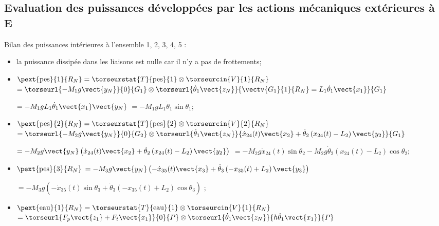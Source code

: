\begin{multicols}{2}
\begin{corrige}
\end{corrige}
\else
\fi


\subsection*{Evaluation des puissances développées par les actions mécaniques extérieures à E}
\ifprof
\begin{corrige}
Bilan des puissances intérieures à l'ensemble 1, 2, 3, 4, 5 :
\begin{itemize}
\item la puissance dissipée dans les liaisons est nulle car il n'y a pas de frottements;
\item  $\pext{\text{pes}}{1}{R_N} = \torseurstat{T}{\text{pes}}{1}\otimes \torseurcin{V}{1}{R_N}$ 
$=\torseurl{-M_1g\vect{y_N}}{0}{G_1}\otimes \torseurl{\dot{\theta}_1\vect{z_N}}{\vectv{G_1}{1}{R_N}=L_1 \dot{\theta}_1\vect{x_1}}{G_1}$ 

 $=-M_1gL_1 \dot{\theta}_1\vect{x_1}\vect{y_N}$ $=-M_1gL_1 \dot{\theta}_1\sin \theta_1$;

\item  $\pext{\text{pes}}{2}{R_N} = \torseurstat{T}{\text{pes}}{2}\otimes \torseurcin{V}{2}{R_N}$ 
$=\torseurl{-M_2g\vect{y_N}}{0}{G_2}\otimes \torseurl{\dot{\theta}_1\vect{z_N}}{ \dot{x}_{24}(t)  \vect{x_2}+\dot{\theta}_2\left(  x_{24}(t)  -L_2 \right)\vect{y_2}}{G_1}$ 

 $= -M_2g\vect{y_N}\left(\dot{x}_{24}(t)  \vect{x_2}+\dot{\theta}_2\left(  x_{24}(t)  -L_2 \right)\vect{y_2}\right)$ $= -M_2g\dot{x}_{24}(t) \sin \theta_2-M_2g\dot{\theta}_2\left(  x_{24}(t)  -L_2 \right)\cos \theta_2$;

\item  $\pext{\text{pes}}{3}{R_N} $
 $= -M_3g\vect{y_N}\left(-\dot{x}_{35}(t)  \vect{x_3}+\dot{\theta}_3\left( - x_{35}(t)  +L_2 \right)\vect{y_3}\right)$
 
  $= -M_3g\left(-\dot{x}_{35}(t)  \sin\theta_3+\dot{\theta}_3\left( - x_{35}(t)  +L_2 \right)\cos\theta_3\right)$ ;
 
  
\item  $\pext{\text{eau}}{1}{R_N} = \torseurstat{T}{\text{eau}}{1}\otimes \torseurcin{V}{1}{R_N}$ 
$=\torseurl{F_p \vect{z_1}+F_t \vect{x_1}}{0}{P}\otimes \torseurl{\dot{\theta}_1\vect{z_N}}{h \dot{\theta}_1\vect{x_1}}{P}$ 


\end{itemize}
\end{corrige}
\end{multicols}
